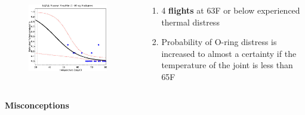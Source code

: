 \documentclass[aspectratio=1610,pdftex,dvipsnames,compress,xcolor={dvipsnames}]{beamer}
\begin{document}
\begin{frame}{}
    \begin{columns}[c]

        \begin{column}{0.65\textwidth}
            \begin{figure}
                \centering
                \includegraphics[width=0.95\textwidth]{challenger.prob.jpg}
            \end{figure}
        \end{column}

        \begin{column}{0.35\textwidth}
            \begin{enumerate}[series=outerlist,topsep=0pt,itemsep=15pt,leftmargin=*,label=(\arabic*)]
                \item[]4 \textbf{flights} at 63\degree F or below experienced thermal distress
                \item[]Probability of O-ring distress is increased to almost a certainty if the temperature of the joint is less than 65\degree F
            \end{enumerate}
        \end{column}

    \end{columns}
\end{frame}


\begin{frame}[plain]{}
    \centering\LARGE\textbf{Misconceptions}
\end{frame}
\end{document}
